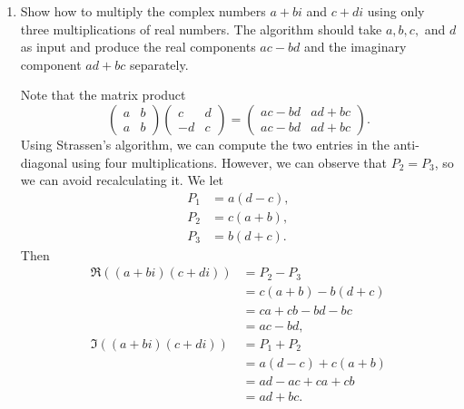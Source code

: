 \documentclass[Chapter04]{subfiles}
\begin{document}
\begin{enumerate}
		\item Show how to multiply the complex numbers $a + bi$ and $c + di$ using only three multiplications of real numbers. The algorithm should take $a, b, c,$ and $d$ as input and produce the real components $ac-bd$ and the imaginary component $ad+bc$ separately.
		\begin{answer}
			Note that the matrix product
			\[
				\begin{pmatrix}
					a & b\\
					a & b
				\end{pmatrix}
				\begin{pmatrix}
					c & d\\
					-d & c
				\end{pmatrix}
				=
				\begin{pmatrix}
					ac-bd & ad + bc\\
					ac-bd & ad + bc
				\end{pmatrix}
				.
			\]
			Using Strassen's algorithm, we can compute the two entries in the anti-diagonal using four multiplications. However, we can observe that $P_2 = P_3$, so we can avoid recalculating it. We let
			\begin{align*}
				P_1 &= a(d - c),\\
				P_2 &= c(a + b),\\
				P_3 &= b(d + c).
			\end{align*}
			Then
			\begin{align*}
				\Re((a + bi)(c + di)) &= P_2 - P_3\\
					&= c(a + b) - b(d + c)\\
					&= ca + cb - bd -bc\\
					&= ac - bd,\\
				\Im((a + bi)(c + di)) &= P_1 + P_2\\
					&= a(d - c) + c(a + b)\\
					&= ad - ac + ca + cb\\
					&= ad + bc.
			\end{align*}
		\end{answer}

	\end{enumerate}
\end{document}

